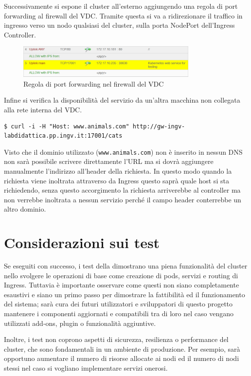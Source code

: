 \documentclass[12pt,a4paper,openright,twoside]{book}
\begin{document}
Successivamente si espone il cluster all'esterno aggiungendo una regola di port forwarding al firewall del VDC. Tramite questa si va a ridirezionare il traffico in ingresso verso
un nodo qualsiasi del cluster, sulla porta NodePort dell'Ingress Controller.
\begin{figure}[!hbt]
    \centering
    \includegraphics[width=0.8\textwidth]{figures/forwarding-rule.png}
    \caption{Regola di port forwarding nel firewall del VDC}
    \label{fig:firewall-rule}
\end{figure}
Infine si verifica la disponibilità del servizio da un'altra macchina non collegata alla rete interna del VDC. 
\begin{lstlisting}
$ curl -i -H "Host: www.animals.com" http://gw-ingv-labdidattica.pp.ingv.it:17001/cats
\end{lstlisting}
Visto che il dominio utilizzato (\texttt{www.animals.com}) non è inserito in nessun DNS non sarà possibile scrivere direttamente l'URL ma si dovrà aggiungere manualmente
l'indirizzo all'header della richiesta. In questo modo quando la richiesta viene inoltrata attraverso da Ingress questo saprà quale host si sta richiedendo,
senza questo accorgimento la richiesta arriverebbe al controller ma non verrebbe inoltrata a nessun servizio perché il campo header conterrebbe un altro dominio. 

\section{Considerazioni sui test}
\label{sec:test-concl}
Se eseguiti con successo, i test della  dimostrano una piena funzionalità del cluster nello svolgere le operazioni di base come creazione di pods, servizi e routing di Ingress.
Tuttavia è importante osservare come questi non siano completamente esaustivi e siano un primo passo per dimostrare la fattibilità ed il funzionamento del sistema; sarà cura dei futuri utilizzatori e sviluppatori di questo progetto mantenere i componenti aggiornati e compatibili tra
di loro nel caso vengano utilizzati add-ons, plugin o funzionalità aggiuntive.

%
Inoltre, i test non coprono aspetti di sicurezza, resilienza o performance del cluster, che sono fondamentali in un ambiente di produzione. Per esempio, sarà opportuno 
aumentare il numero di risorse allocate ai nodi ed il numero di nodi stessi nel caso si vogliano implementare servizi onerosi. 
%
\end{document}
